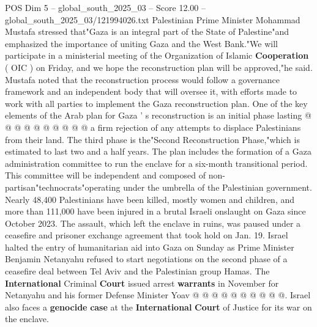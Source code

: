 \begin{textsample}{POS Dim 5 – global\_south\_2025\_03 – Score 12.00 – global\_south\_2025\_03/121994026.txt}
Palestinian Prime Minister Mohammad Mustafa stressed that"Gaza is an integral part of the State of Palestine"and emphasized the importance of uniting Gaza and the West Bank."We will participate in a ministerial meeting of the Organization of Islamic \textbf{Cooperation} ( OIC ) on Friday, and we hope the reconstruction plan will be approved,"he said.
Mustafa noted that the reconstruction process would follow a governance framework and an independent body that will oversee it, with efforts made to work with all parties to implement the Gaza reconstruction plan.
One of the key elements of the Arab plan for Gaza ' s reconstruction is an initial phase lasting @ @ @ @ @ @ @ @ @ @ a firm rejection of any attempts to displace Palestinians from their land.
The third phase is the"Second Reconstruction Phase,"which is estimated to last two and a half years.
The plan includes the formation of a Gaza administration committee to run the enclave for a six-month transitional period.
This committee will be independent and composed of non-partisan"technocrats"operating under the umbrella of the Palestinian government.
Nearly 48,400 Palestinians have been killed, mostly women and children, and more than 111,000 have been injured in a brutal Israeli onslaught on Gaza since October 2023.
The assault, which left the enclave in ruins, was paused under a ceasefire and prisoner exchange agreement that took hold on Jan. 19.
Israel halted the entry of humanitarian aid into Gaza on Sunday as Prime Minister Benjamin Netanyahu refused to start negotiations on the second phase of a ceasefire deal between Tel Aviv and the Palestinian group Hamas.
The \textbf{International} Criminal \textbf{Court} issued arrest \textbf{warrants} in November for Netanyahu and his former Defense Minister Yoav @ @ @ @ @ @ @ @ @ @.
Israel also faces a \textbf{genocide} \textbf{case} at the \textbf{International} \textbf{Court} of Justice for its war on the enclave.

\end{textsample}
